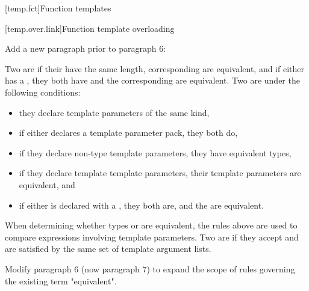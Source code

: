 [temp.fct]{Function templates}

[temp.over.link]{Function template overloading}

Add a new paragraph prior to paragraph 6:

\begin{addedblock}
\setcounter{Paras}{5}
\pnum
Two  are  if
their  have the same length,
corresponding  are equivalent,
and if either has a , they both have
 and the corresponding
 are equivalent.
Two  are 
under the following conditions:
\begin{itemize}
\item they declare template parameters of the same kind,
\item if either declares a template parameter pack, they both do,
\item if they declare non-type template parameters, they have
equivalent types,
\item if they declare template template parameters, their template
parameters are equivalent, and
\item if either is declared with a ,
they both are, and the  are
equivalent.
\end{itemize}
When determining whether types or 
are equivalent, the rules above are used to compare expressions
involving template parameters.
Two  are 
if they accept and are satisfied by the same set of template argument
lists.
\end{addedblock}

Modify paragraph 6 (now paragraph 7) to expand the scope of rules
governing the existing term "equivalent".

